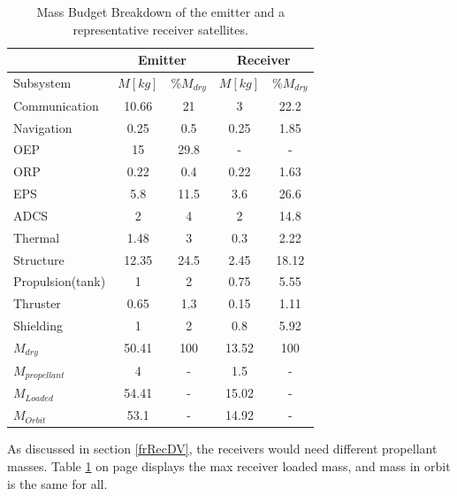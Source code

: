 \begin{table}[h!]
\centering
\begin{tabular}{|l|c|c|c|c|}
\hline
 & \multicolumn{2}{|c|}{Emitter} & \multicolumn{2}{|c|}{Receiver} \\\hline
 Subsystem        & $M [kg]$ & \%$M_{dry}$ & $M [kg]$ & \%$M_{dry}$ \\\hline\hline
 Communication    & 10.66    & 21          & 3        & 22.2 \\\hline
 Navigation       & 0.25     & 0.5         & 0.25     & 1.85 \\\hline
 OEP              & 15       & 29.8        & -        & - \\\hline
 ORP              & 0.22     & 0.4         & 0.22     & 1.63 \\\hline
 EPS              & 5.8      & 11.5        & 3.6      & 26.6 \\\hline
 ADCS             & 2        & 4           & 2        & 14.8 \\\hline
 Thermal          & 1.48     & 3           & 0.3      & 2.22 \\\hline
 Structure        & 12.35    & 24.5        & 2.45     & 18.12 \\\hline
 Propulsion(tank) & 1        & 2           & 0.75     & 5.55 \\\hline
 Thruster         & 0.65     & 1.3         & 0.15     & 1.11 \\\hline
 Shielding        & 1        & 2           & 0.8      & 5.92 \\\hline\hline
 $M_{dry}$        & 50.41    & 100         & 13.52    & 100 \\\hline
 $M_{propellant}$ & 4        & -           & 1.5      & - \\\hline
 $M_{Loaded}$     & 54.41    & -           & 15.02    & - \\\hline
 $M_{Orbit}$      & 53.1     & -           & 14.92    & - \\\hline
\end{tabular}
\caption{Mass Budget Breakdown of the emitter and a representative receiver satellites.}
\label{tab:MB}
\end{table}

As discussed in section \ref{frRecDV}, the receivers would need different propellant masses. Table \ref{tab:MB} on page \pageref{tab:MB} displays the max receiver loaded mass, and mass in orbit is the same for all.

